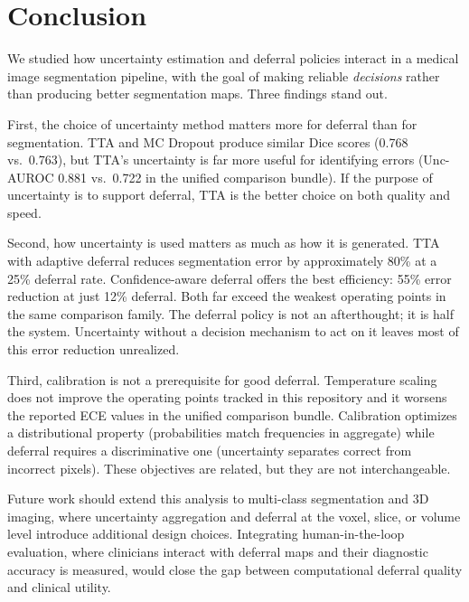 \section{Conclusion}
\label{sec:conclusion}

We studied how uncertainty estimation and deferral policies interact in
a medical image segmentation pipeline, with the goal of making reliable
\emph{decisions} rather than producing better segmentation maps. Three
findings stand out.

First, the choice of uncertainty method matters more for deferral than for
segmentation. TTA and MC Dropout produce similar Dice scores (0.768 vs.\
0.763), but TTA's uncertainty is far more useful for identifying errors
(Unc-AUROC 0.881 vs.\ 0.722 in the unified comparison bundle). If the purpose of uncertainty is to support
deferral, TTA is the better choice on both quality and speed.

Second, how uncertainty is used matters as much as how it is generated.
TTA with adaptive deferral reduces segmentation error by approximately 80\%
at a 25\% deferral rate. Confidence-aware deferral offers the best efficiency:
55\% error reduction at just 12\% deferral. Both far exceed the weakest
operating points in the same comparison family. The deferral policy is not an afterthought;
it is half the system. Uncertainty without a decision mechanism to act on it
leaves most of this error reduction unrealized.

Third, calibration is not a prerequisite for good deferral. Temperature
scaling does not improve the operating points tracked in this repository and
it worsens the reported ECE values in the unified comparison bundle.
Calibration optimizes a distributional property (probabilities match
frequencies in aggregate) while deferral requires a discriminative one
(uncertainty separates correct from incorrect pixels). These objectives
are related, but they are not interchangeable.

Future work should extend this analysis to multi-class segmentation and
3D imaging, where uncertainty aggregation and deferral at the voxel, slice,
or volume level introduce additional design choices. Integrating
human-in-the-loop evaluation, where clinicians interact with deferral maps
and their diagnostic accuracy is measured, would close the gap between
computational deferral quality and clinical utility.
